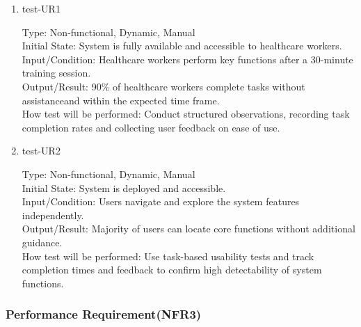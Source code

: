 \documentclass[12pt, titlepage]{article}
\begin{document}
\begin{enumerate}
    \item{test-UR1\\} \label{test-UR1}
    
    Type: Non-functional, Dynamic, Manual\\
    
    Initial State: System is fully available and accessible to healthcare workers.\\
    
    Input/Condition: Healthcare workers perform key functions after a 30-minute training session.\\
    
    Output/Result: 90\% of healthcare workers complete tasks without assistanceand within the expected time frame.\\
    
    How test will be performed: Conduct structured observations, recording task completion rates and collecting user feedback on ease of use.

    \item{test-UR2\\} \label{test-UR2}
    
    Type: Non-functional, Dynamic, Manual\\
    
    Initial State: System is deployed and accessible.\\
    
    Input/Condition: Users navigate and explore the system features independently.\\
    
    Output/Result: Majority of users can locate core functions without additional guidance.\\
    
    How test will be performed: Use task-based usability tests and track completion times and feedback to confirm high detectability of system functions.
\end{enumerate}

\subsubsection{Performance Requirement(NFR3)} \label{section:4.2.3}
\end{document}
